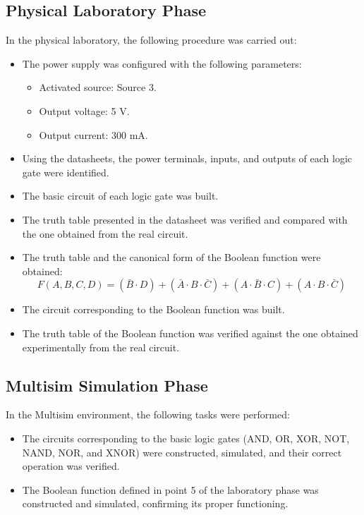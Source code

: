 \documentclass[12pt]{article}  %
\begin{document}
\subsection{Physical Laboratory Phase}
In the physical laboratory, the following procedure was carried out:
\begin{itemize}
    \item The power supply was configured with the following parameters:
    \begin{itemize}
        \item Activated source: Source 3.
        \item Output voltage: 5 V.
        \item Output current: 300 mA.
    \end{itemize}
    \item Using the datasheets, the power terminals, inputs, and outputs of each logic gate were identified.
    \item The basic circuit of each logic gate was built.
    \item The truth table presented in the datasheet was verified and compared with the one obtained from the real circuit.
    \item The truth table and the canonical form of the Boolean function were obtained:
    $$
    F(A,B,C,D) = (\bar{B} \cdot D) + (\bar{A} \cdot B \cdot \bar{C}) + (A \cdot \bar{B} \cdot C) + (A \cdot B \cdot \bar{C})
    $$
    \item The circuit corresponding to the Boolean function was built.
    \item The truth table of the Boolean function was verified against the one obtained experimentally from the real circuit.
\end{itemize}

\subsection{Multisim Simulation Phase}
In the Multisim environment, the following tasks were performed:
\begin{itemize}
    \item The circuits corresponding to the basic logic gates (AND, OR, XOR, NOT, NAND, NOR, and XNOR) were constructed, simulated, and their correct operation was verified.
    \item The Boolean function defined in point 5 of the laboratory phase was constructed and simulated, confirming its proper functioning.
\end{itemize}
\end{document}
